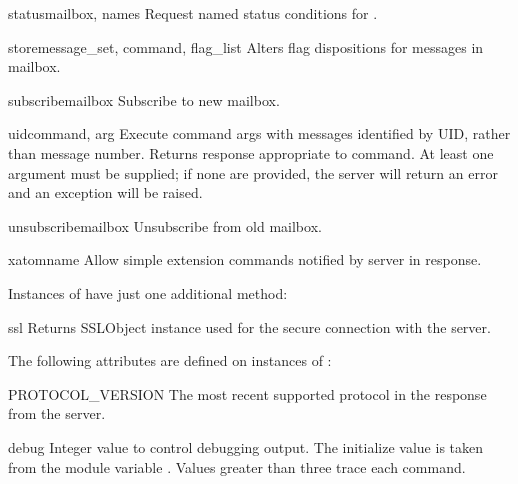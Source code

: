 \begin{methoddesc}{status}{mailbox, names}
  Request named status conditions for . 
\end{methoddesc}

\begin{methoddesc}{store}{message_set, command, flag_list}
  Alters flag dispositions for messages in mailbox.
\end{methoddesc}

\begin{methoddesc}{subscribe}{mailbox}
  Subscribe to new mailbox.
\end{methoddesc}

\begin{methoddesc}{uid}{command, arg}
  Execute command args with messages identified by UID, rather than
  message number.  Returns response appropriate to command.  At least
  one argument must be supplied; if none are provided, the server will
  return an error and an exception will be raised.
\end{methoddesc}

\begin{methoddesc}{unsubscribe}{mailbox}
  Unsubscribe from old mailbox.
\end{methoddesc}

\begin{methoddesc}{xatom}{name}
  Allow simple extension commands notified by server in
   response.
\end{methoddesc}


Instances of  have just one additional method:

\begin{methoddesc}{ssl}{}
  Returns SSLObject instance used for the secure connection with the server.
\end{methoddesc}


The following attributes are defined on instances of :


\begin{memberdesc}{PROTOCOL_VERSION}
The most recent supported protocol in the
 response from the server.
\end{memberdesc}

\begin{memberdesc}{debug}
Integer value to control debugging output.  The initialize value is
taken from the module variable .  Values greater than
three trace each command.
\end{memberdesc}


